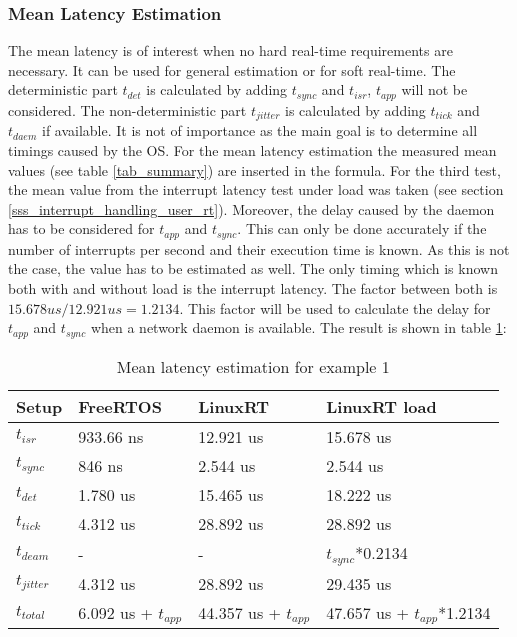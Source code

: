 \subsubsection{Mean Latency Estimation}
The mean latency is of interest when no hard real-time requirements are necessary. 
It can be used for general estimation or for soft real-time.
The deterministic part $t_{det}$ is calculated by adding $t_{sync}$ and $t_{isr}$, $t_{app}$ will not be considered. 
The non-deterministic part $t_{jitter}$ is calculated by adding $t_{tick}$ and $t_{daem}$ if available.
It is not of importance as the main goal is to determine all timings caused by the \ac{OS}.
For the mean latency estimation the measured mean values (see table \ref{tab_summary}) are inserted in the formula.
For the third test, the mean value from the interrupt latency test under load was taken (see section \ref{sss_interrupt_handling_user_rt}).
Moreover, the delay caused by the daemon has to be considered for $t_{app}$ and $t_{sync}$.
This can only be done accurately if the number of interrupts per second and their execution time is known.
As this is not the case, the value has to be estimated as well.
The only timing which is known both with and without load is the interrupt latency.
The factor between both is $15.678 us / 12.921 us = 1.2134 $.   
This factor will be used to calculate the delay for $t_{app}$ and $t_{sync}$ when a network daemon is available.
The result is shown in table \ref{tab_example1_mean}:
\begin{table}[htbp]
	\centering
		\begin{tabular}{|l|l|l|l|}
			\hline
				Setup					& FreeRTOS 								& LinuxRT 							& LinuxRT load  \\
				\hline 
				$t_{isr}$ 		& 933.66 ns 							& 12.921 us 						& 15.678 us			\\
			  $t_{sync}$		& 846 ns	  							& 2.544 us 				 			& 2.544 us			\\
			  \hline 
			  $t_{det}$			& 1.780 us  							& 15.465 us 				 		& 18.222 us			\\ 
			  \hline
			  \hline
			  $t_{tick}$		& 4.312 us								& 28.892 us 					  & 28.892 us											\\
			  $t_{deam}$		& -				  							& - 				 						& $t_{sync}$*0.2134							\\ 
				\hline 
			  $t_{jitter}$	& 4.312 us  							& 28.892 us						  & 29.435 us											\\ 
			  \hline
			  \hline 
			  $t_{total}$		& 6.092 us + $t_{app}$	 & 44.357 us + $t_{app}$  &	47.657 us + $t_{app}$*1.2134 	\\ 
			\hline
		\end{tabular}
	\caption{Mean latency estimation for example 1}
	\label{tab_example1_mean}
\end{table}

